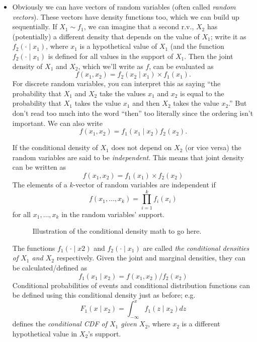 \begin{itemize}
\item Obviously we can have vectors of random variables (often called
  \emph{random vectors}).  These vectors have density functions too,
  which we can build up sequentially.  If $X_1 \sim f_1$, we can
  imagine that a second r.v., $X_2$ has (potentially) a different
  density that depends on the value of $X_1$; write it as $f_2(\cdot
  \mid x_1)$, where $x_1$ is a hypothetical value of $X_1$ (and the
  function $f_2(\cdot \mid x_1)$ is defined for all values in the
  support of $X_1$.  Then the joint density of $X_1$ and $X_2$, which
  we'll write as $f$, can be evaluated as
  \begin{equation}\label{p2}
    f(x_1,x_2) = f_2(x_2 \mid x_1) \times f_1(x_1).
  \end{equation}
  For discrete random variables, you can interpret this as saying
  ``the probability that $X_1$ and $X_2$ take the values $x_1$ and $x_2$
  is equal to the probability that $X_1$ takes the value $x_1$ and then
  $X_2$ takes the value $x_2$.''  But don't read too much into the word
  ``then'' too literally since the ordering isn't important.  We can
  also write
  \begin{equation}
    f(x_1,x_2) = f_1(x_1 \mid x_2) f_2(x_2).
  \end{equation}

  If the conditional density of $X_1$ does not depend on $X_2$ (or vice
  versa) the random variables are said to be \emph{independent}.  This
  means that joint density can be written as
  \begin{equation*}
    f(x_1,x_2) = f_1(x_1) \times f_2(x_2)
  \end{equation*}
  The elements of a $k$-vector of random variables are independent if
  \begin{equation*}
    f(x_1,\dots,x_k) = \prod_{i=1}^k f_i(x_i)
  \end{equation*}
  for all $x_1,\dots,x_k$ in the random variables' support.

\begin{figure}[t]
  [Empty for now.  Sometime soon, I'll add a figure.]
  \caption{Illustration of the conditional density math to go here.}
\end{figure}

  The functions $f_1(\cdot \mid x2)$ and $f_2(\cdot \mid x_1)$ are called \emph{the
  conditional densities of $X_1$ and $X_2$} respectively.  Given the
  joint and marginal densities, they can be calculated/defined as
  \begin{equation*}
    f_1(x_1 \mid x_2) = f(x_1, x_2) / f_2(x_2)
  \end{equation*}
  Conditional probabilities of events and conditional distribution
  functions can be defined using this conditional density just as
  before; e.g.
  \begin{equation*}
    F_1(x \mid x_2) = \int_{-\infty}^x f_1(z \mid x_2) dz
  \end{equation*}
  defines the \emph{conditional CDF of $X_1$ given $X_2$}, where $x_2$ is
  a different hypothetical value in $X_2$'s support.


\end{itemize}
